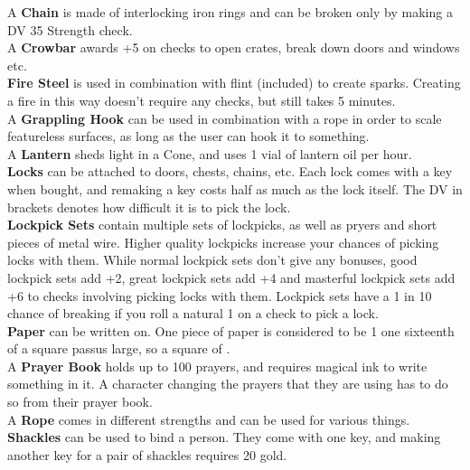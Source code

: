 A \textbf{Chain} is made of interlocking iron rings and can be broken only by making a DV 35 Strength check.\\

A \textbf{Crowbar} awards +5 on checks to open crates, break down doors and windows etc.\\

\textbf{Fire Steel} is used in combination with flint (included) to create sparks. Creating a fire in this way doesn't require any checks, but still takes 5 minutes.\\

A \textbf{Grappling Hook} can be used in combination with a rope in order to scale featureless surfaces, as long as the user can hook it to something.\\

A \textbf{Lantern} sheds light in a  Cone, and uses 1 vial of lantern oil per hour.\\

\textbf{Locks} can be attached to doors, chests, chains, etc. Each lock comes with a key when bought, and remaking a key costs half as much as the lock itself. The DV in brackets denotes how difficult it is to pick the lock.\\

\textbf{Lockpick Sets} contain multiple sets of lockpicks, as well as pryers and short pieces of metal wire. Higher quality lockpicks increase your chances of picking locks with them. While normal lockpick sets don't give any bonuses, good lockpick sets add +2, great lockpick sets add +4 and masterful lockpick sets add +6 to checks involving picking locks with them. Lockpick sets have a 1 in 10 chance of breaking if you roll a natural 1 on a check to pick a lock.\\

\textbf{Paper} can be written on. One piece of paper is considered to be 1 one sixteenth of a square passus large, so a square of  .\\

A \textbf{Prayer Book} holds up to 100 prayers, and requires magical ink to write something in it. A character changing the prayers that they are using has to do so from their prayer book.\\

A \textbf{Rope} comes in different strengths and can be used for various things.\\

\textbf{Shackles} can be used to bind a person. They come with one key, and making another key for a pair of shackles requires 20 gold.\\

